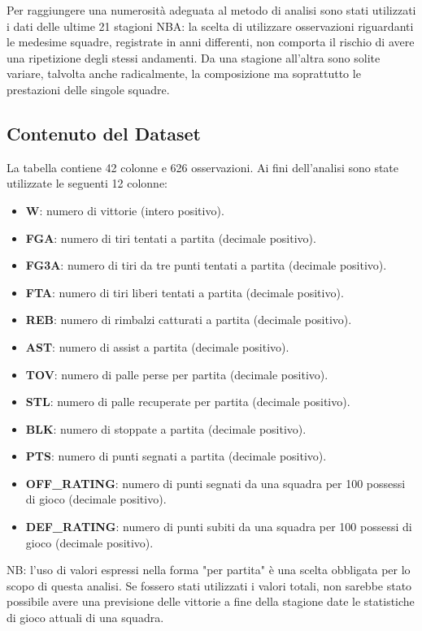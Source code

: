 \documentclass[11pt,a4paper]{article}
\begin{document}
Per raggiungere una numerosità adeguata al metodo di analisi sono stati utilizzati i dati delle ultime 21 stagioni NBA: la scelta di utilizzare osservazioni riguardanti le medesime squadre, registrate in anni differenti, non comporta il rischio di avere una ripetizione degli stessi andamenti. Da una stagione all'altra sono solite variare, talvolta anche radicalmente, la composizione ma soprattutto le prestazioni delle singole squadre. 

\subsection{Contenuto del Dataset}
La tabella contiene 42 colonne e 626 osservazioni. Ai fini dell'analisi sono state utilizzate le seguenti 12 colonne:
\begin{itemize}
    \item \textbf{W}: numero di vittorie (intero positivo).
    \item \textbf{FGA}: numero di tiri tentati a partita (decimale positivo).
    \item \textbf{FG3A}: numero di tiri da tre punti tentati a partita (decimale positivo).
    \item \textbf{FTA}: numero di tiri liberi tentati a partita (decimale positivo).
    \item \textbf{REB}: numero di rimbalzi catturati a partita (decimale positivo).
    \item \textbf{AST}: numero di assist a partita (decimale positivo).
    \item \textbf{TOV}: numero di palle perse per partita (decimale positivo).
    \item \textbf{STL}: numero di palle recuperate per partita (decimale positivo).
    \item \textbf{BLK}: numero di stoppate a partita (decimale positivo).
    \item \textbf{PTS}: numero di punti segnati a partita (decimale positivo).
    \item \textbf{OFF\_RATING}: numero di punti segnati da una squadra per 100 possessi di gioco (decimale positivo).
    \item \textbf{DEF\_RATING}: numero di punti subiti da una squadra per 100 possessi di gioco (decimale positivo).
\end{itemize}

NB: l'uso di valori espressi nella forma "per partita" è una scelta obbligata per lo scopo di questa analisi. Se fossero stati utilizzati i valori totali, non sarebbe stato possibile avere una previsione delle vittorie a fine della stagione date le statistiche di gioco attuali di una squadra.
\end{document}
